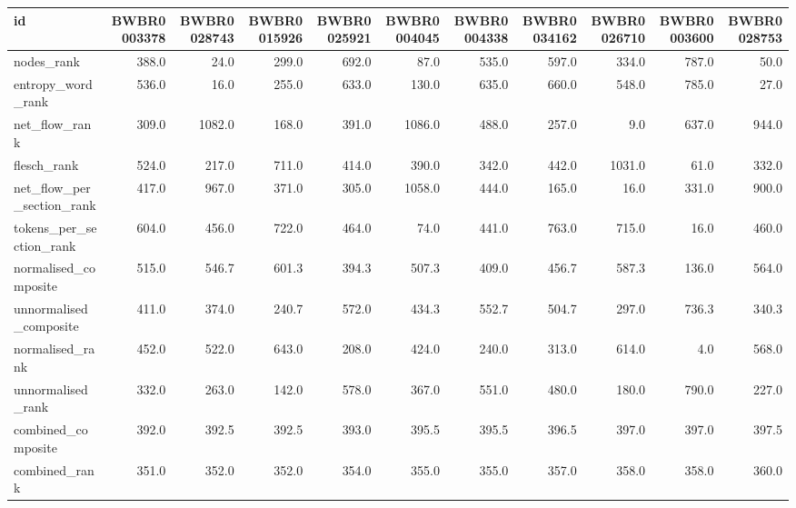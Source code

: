 \begin{tabular}{lrrrrrrrrrr}
\toprule
id & BWBR0003378 & BWBR0028743 & BWBR0015926 & BWBR0025921 & BWBR0004045 & BWBR0004338 & BWBR0034162 & BWBR0026710 & BWBR0003600 & BWBR0028753 \\
\midrule
nodes\_rank & 388.0 & 24.0 & 299.0 & 692.0 & 87.0 & 535.0 & 597.0 & 334.0 & 787.0 & 50.0 \\
\cline{1-11}
entropy\_word\_rank & 536.0 & 16.0 & 255.0 & 633.0 & 130.0 & 635.0 & 660.0 & 548.0 & 785.0 & 27.0 \\
\cline{1-11}
net\_flow\_rank & 309.0 & 1082.0 & 168.0 & 391.0 & 1086.0 & 488.0 & 257.0 & 9.0 & 637.0 & 944.0 \\
\cline{1-11}
flesch\_rank & 524.0 & 217.0 & 711.0 & 414.0 & 390.0 & 342.0 & 442.0 & 1031.0 & 61.0 & 332.0 \\
\cline{1-11}
net\_flow\_per\_section\_rank & 417.0 & 967.0 & 371.0 & 305.0 & 1058.0 & 444.0 & 165.0 & 16.0 & 331.0 & 900.0 \\
\cline{1-11}
tokens\_per\_section\_rank & 604.0 & 456.0 & 722.0 & 464.0 & 74.0 & 441.0 & 763.0 & 715.0 & 16.0 & 460.0 \\
\cline{1-11}
normalised\_composite & 515.0 & 546.7 & 601.3 & 394.3 & 507.3 & 409.0 & 456.7 & 587.3 & 136.0 & 564.0 \\
\cline{1-11}
unnormalised\_composite & 411.0 & 374.0 & 240.7 & 572.0 & 434.3 & 552.7 & 504.7 & 297.0 & 736.3 & 340.3 \\
\cline{1-11}
normalised\_rank & 452.0 & 522.0 & 643.0 & 208.0 & 424.0 & 240.0 & 313.0 & 614.0 & 4.0 & 568.0 \\
\cline{1-11}
unnormalised\_rank & 332.0 & 263.0 & 142.0 & 578.0 & 367.0 & 551.0 & 480.0 & 180.0 & 790.0 & 227.0 \\
\cline{1-11}
combined\_composite & 392.0 & 392.5 & 392.5 & 393.0 & 395.5 & 395.5 & 396.5 & 397.0 & 397.0 & 397.5 \\
\cline{1-11}
combined\_rank & 351.0 & 352.0 & 352.0 & 354.0 & 355.0 & 355.0 & 357.0 & 358.0 & 358.0 & 360.0 \\
\cline{1-11}
\bottomrule
\end{tabular}
